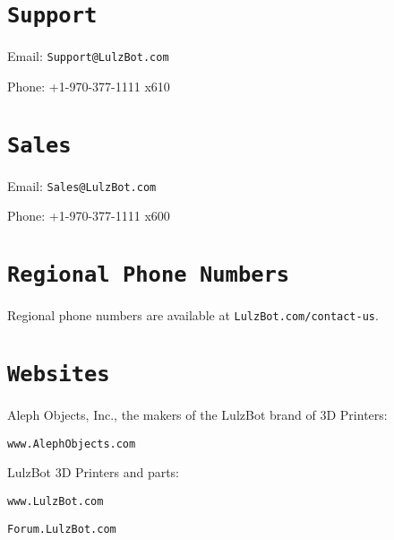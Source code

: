%
%
%
%
%

\section{\texttt{Support}}
\setlength{\parindent}{0pt}
Email: \texttt{Support@LulzBot.com}

Phone: +1-970-377-1111 x610

\section{\texttt{Sales}}

Email: \texttt{Sales@LulzBot.com}

Phone: +1-970-377-1111 x600

\section{\texttt{Regional Phone Numbers}}
Regional phone numbers are available at \texttt{LulzBot.com/contact-us}.

\section{\texttt{Websites}}

Aleph Objects, Inc.\textsuperscript{\miniscule{\textregistered}}, the makers of the LulzBot\textsuperscript{\miniscule{\textregistered}} brand of 3D Printers:

\texttt{www.AlephObjects.com}


LulzBot 3D Printers and parts:

\texttt{www.LulzBot.com}

\texttt{Forum.LulzBot.com}

